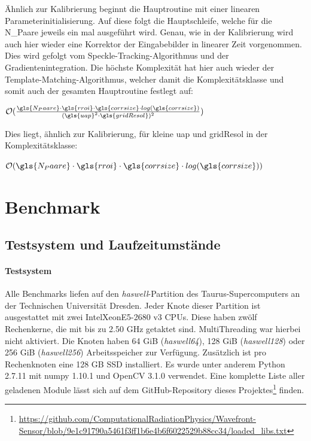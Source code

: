 Ähnlich zur Kalibrierung beginnt die Hauptroutine mit einer linearen Parameterinitialisierung. Auf diese folgt die Hauptschleife, welche für die \gls{N_Paare} jeweils ein mal ausgeführt wird. Genau, wie in der Kalibrierung wird auch hier wieder eine Korrektor der Eingabebilder in linearer Zeit vorgenommen. Dies wird gefolgt vom Speckle-Tracking-Algorithmus und der Gradientenintegration. Die höchste Komplexität hat hier auch wieder der Template-Matching-Algorithmus, welcher damit die Komplexitätsklasse und somit auch der gesamten Hauptroutine festlegt auf:

\begin{center}
	$\mathcal{O}(\frac{\gls{N_Paare} \cdot\gls{rroi} \cdot \gls{corrsize} \cdot log(\gls{corrsize})}{(\gls{uap}^2 \cdot \gls{gridResol})^2})$
\end{center}

Dies liegt, ähnlich zur Kalibrierung, für kleine \gls{uap} und \gls{gridResol} in der Komplexitätsklasse:

\begin{center}
	$\mathcal{O}(\gls{N_Paare} \cdot\gls{rroi} \cdot \gls{corrsize} \cdot log(\gls{corrsize}))$
\end{center}

\section{Benchmark}

\subsection{Testsystem und Laufzeitumstände}

\paragraph{Testsystem}

Alle Benchmarks liefen auf den \textit{haswell}-Partition des Taurus-Supercomputers an der Technischen Universität Dresden. Jeder Knote dieser Partition ist ausgestattet mit zwei Intel\textregistered Xeon\textregistered E5-2680 v3 \glspl{CPU}. Diese haben zwölf Rechenkerne, die mit bis zu 2.50 GHz getaktet sind. MultiThreading war hierbei nicht aktiviert. Die Knoten haben 64 GiB (\textit{haswell64}), 128 GiB (\textit{haswell128}) oder 256 GiB (\textit{haswell256}) Arbeitsspeicher zur Verfügung. Zusätzlich ist pro Rechenknoten eine 128 GB \gls{SSD} installiert. Es wurde unter anderem Python 2.7.11 mit numpy 1.10.1 und OpenCV 3.1.0 verwendet. Eine komplette Liste aller geladenen Module lässt sich auf dem GitHub-Repository dieses Projektes\footnote{\url{https://github.com/ComputationalRadiationPhysics/Wavefront-Sensor/blob/9e1c91790a5461f3ff1b6e4b6f6022529b88cc34/loaded_libs.txt}} finden.

